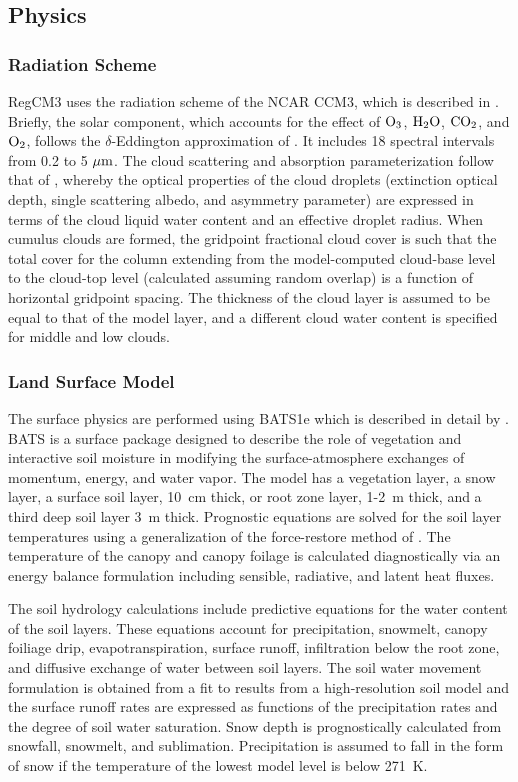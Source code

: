 \newpage
\subsection{Physics} \label{sec:physics}

\subsubsection{Radiation Scheme}
\noindent
RegCM3 uses the radiation scheme of the NCAR CCM3, which 
is described in \cite{Kiehl_96}.  Briefly, the solar 
component, which accounts for the effect of ${\rm O_3}$, ${\rm H_2O}$, 
${\rm CO_2}$, and ${\rm O_2}$, follows the $\delta$-Eddington 
approximation of \cite{Kiehl_96}.  It includes 18 spectral 
intervals from 0.2 to 5 $\mu {\rm m}$. The cloud scattering and 
absorption parameterization follow that of \cite{Slingo_89}, 
whereby the optical properties of the cloud droplets (extinction 
optical depth, single scattering albedo, and asymmetry parameter)
are expressed in terms of the cloud liquid water content and an 
effective droplet radius.
When cumulus clouds are formed, the gridpoint fractional 
cloud cover is such that the total cover for the column extending
from the model-computed cloud-base level to the cloud-top level 
(calculated assuming random overlap) is a function of horizontal
gridpoint spacing.  The thickness of the cloud layer is assumed
to be equal to that of the model layer, and a different cloud 
water content is specified for middle and low clouds.

\subsubsection{Land Surface Model}
The surface physics are performed using \ac{BATS1e} which is described in detail by \cite{Dickinson_93}. 
BATS is a surface package designed to describe the role
of vegetation and interactive soil moisture in modifying the 
surface-atmosphere exchanges of momentum, energy, and water vapor.
The model has a vegetation layer, a snow layer, a surface soil layer, 
10~cm thick, or root zone layer, 1-2~m thick, and a third deep soil
layer 3~m thick.  Prognostic equations are solved for the soil layer temperatures 
using a generalization of the force-restore method of \cite{Deardoff_78}.  The 
temperature of the canopy and canopy foilage is calculated diagnostically
via an energy balance formulation including sensible, radiative, and 
latent heat fluxes.

The soil hydrology calculations include predictive equations for the water
content of the soil layers.  These equations account for precipitation, 
snowmelt, canopy foiliage drip, evapotranspiration, surface runoff, 
infiltration below the root zone, and diffusive exchange of water between 
soil layers.  The soil water movement formulation is obtained from 
a fit to results from a high-resolution soil model \cite{Dickinson_84} and
the surface runoff rates are expressed as functions of the precipitation 
rates and the degree of soil water saturation.  Snow depth is prognostically
calculated from snowfall, snowmelt, and sublimation.  Precipitation is 
assumed to fall in the form of snow if the temperature of the lowest 
model level is below 271~K.

